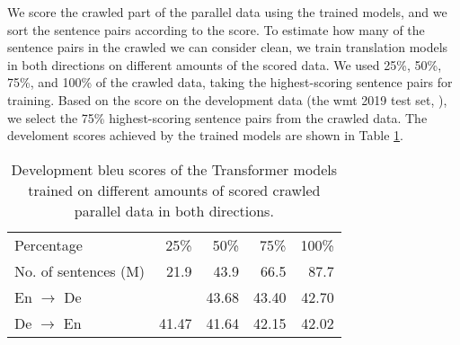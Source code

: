 We score the crawled part of the parallel data using the trained models, and we
sort the sentence pairs according to the score. To estimate how many of the
sentence pairs in the crawled we can consider clean, we train translation
models in both directions on different amounts of the scored data. We used
25\%, 50\%, 75\%, and 100\% of the crawled data, taking the highest-scoring
sentence pairs for training. Based on the score on the development data (the
\ac{wmt} 2019 test set, \citealp{barrault-etal-2019-findings}), we select the
75\% highest-scoring sentence pairs from the crawled data.  The develoment scores achieved by the
trained models are shown in Table \ref{tab:dual-cross-entropy-selection}.

\begin{table}
  \centering
  \begin{tabular}{lrrrr}
    \toprule
    Percentage & 25\% & 50\% & 75\% & 100\% \\
    No. of sentences (M) & 21.9  & 43.9 & 66.5 & 87.7 \\
    \midrule
    En $\rightarrow$ De &  & 43.68 & 43.40 & 42.70 \\
    De $\rightarrow$ En & 41.47 & 41.64 & 42.15 & 42.02 \\
    \bottomrule
  \end{tabular}
  \caption{Development \acs{bleu} scores of the Transformer models trained on
    different amounts of scored crawled parallel data in both directions.}%
  \label{tab:dual-cross-entropy-selection}
\end{table}


